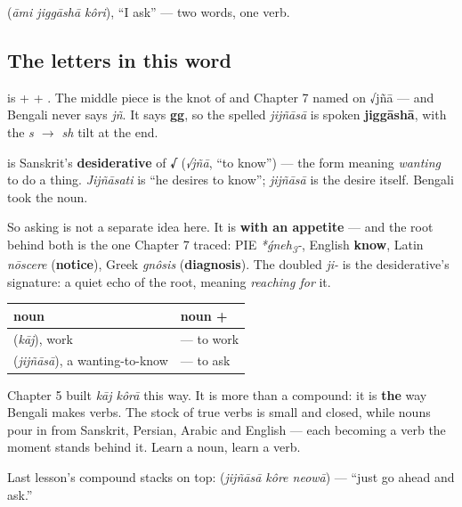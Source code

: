    (\emph{āmi jiggāshā kôri}), \textquotedblleft{}I ask\textquotedblright{} — two words, one verb.

\subsection*{The letters in this word}
\textbf{} is \textbf{} + \textbf{} + \textbf{}. The middle piece \textbf{} is the knot of \textbf{} and \textbf{} Chapter 7 named on √jñā — and Bengali never says \emph{jñ}. It says \textbf{gg}, so the spelled \emph{jijñāsā} is spoken \textbf{jiggāshā}, with the \emph{s $\to$ sh} tilt at the end.

\begin{cousinweb}
\textbf{} is Sanskrit's \textbf{desiderative} of \textbf{√} (\emph{√jñā}, \textquotedblleft{}to know\textquotedblright{}) — the form meaning \emph{wanting} to do a thing. \emph{Jijñāsati} is \textquotedblleft{}he desires to know\textquotedblright{}; \emph{jijñāsā} is the desire itself. Bengali took the noun.

So asking is not a separate idea here. It is \textbf{ with an appetite} — and the root behind both is the one Chapter 7 traced: PIE \emph{*ǵneh\textsubscript{3}-}, English \textbf{know}, Latin \emph{nōscere} (\textbf{notice}), Greek \emph{gnôsis} (\textbf{diagnosis}). The doubled \emph{ji-} is the desiderative's signature: a quiet echo of the root, meaning \emph{reaching for} it.
\end{cousinweb}

\begin{grammarlens}[title={Grammar Lens: any noun plus \bn{করা} is a verb}]
\noindent
\begin{tabularx}{\linewidth}{@{}>{\raggedright\arraybackslash}X>{\raggedright\arraybackslash}X@{}}
\toprule
\textbf{noun} & \textbf{noun + \bn{করা}} \\
\midrule
\bn{কাজ} (\emph{kāj}), work & \bn{কাজ} \bn{করা} — to work \\
\bn{জিজ্ঞাসা} (\emph{jijñāsā}), a wanting-to-know & \bn{জিজ্ঞাসা} \bn{করা} — to ask \\
\bottomrule
\end{tabularx}

Chapter 5 built \emph{kāj kôrā} this way. It is more than a compound: it is \textbf{the} way Bengali makes verbs. The stock of true verbs is small and closed, while nouns pour in from Sanskrit, Persian, Arabic and English — each becoming a verb the moment  stands behind it. Learn a noun, learn a verb.

Last lesson’s compound stacks on top: \textbf{  } (\emph{jijñāsā kôre neowā}) — \textquotedblleft{}just go ahead and ask.\textquotedblright{}
\end{grammarlens}

